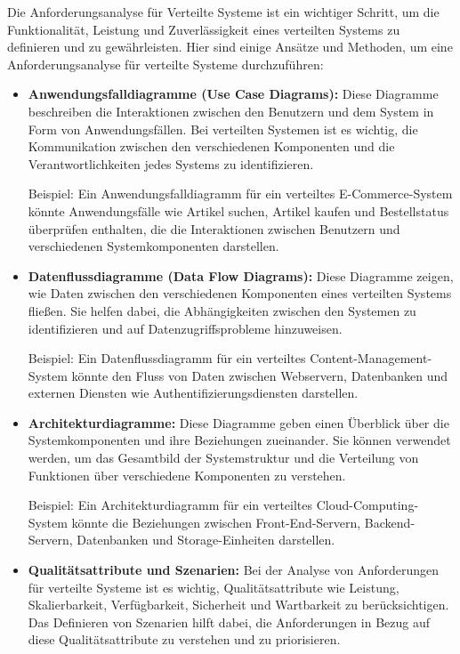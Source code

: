 \documentclass[../vs-script-first-v01.tex]{subfiles}
\begin{document}
Die Anforderungsanalyse für Verteilte Systeme ist ein wichtiger Schritt, um die Funktionalität, Leistung und Zuverlässigkeit eines verteilten Systems zu definieren und zu gewährleisten. Hier sind einige Ansätze und Methoden, um eine Anforderungsanalyse für verteilte Systeme durchzuführen:
\begin{itemize}
  \item \textbf{Anwendungsfalldiagramme (Use Case Diagrams):} Diese Diagramme beschreiben die Interaktionen zwischen den Benutzern und dem System in Form von Anwendungsfällen. Bei verteilten Systemen ist es wichtig, die Kommunikation zwischen den verschiedenen Komponenten und die Verantwortlichkeiten jedes Systems zu identifizieren.

        Beispiel: Ein Anwendungsfalldiagramm für ein verteiltes E-Commerce-System könnte Anwendungsfälle wie Artikel suchen, Artikel kaufen und Bestellstatus überprüfen enthalten, die die Interaktionen zwischen Benutzern und verschiedenen Systemkomponenten darstellen.

  \item \textbf{Datenflussdiagramme (Data Flow Diagrams):} Diese Diagramme zeigen, wie Daten zwischen den verschiedenen Komponenten eines verteilten Systems fließen. Sie helfen dabei, die Abhängigkeiten zwischen den Systemen zu identifizieren und auf Datenzugriffsprobleme hinzuweisen.

        Beispiel: Ein Datenflussdiagramm für ein verteiltes Content-Management-System könnte den Fluss von Daten zwischen Webservern, Datenbanken und externen Diensten wie Authentifizierungsdiensten darstellen.

  \item \textbf{Architekturdiagramme:} Diese Diagramme geben einen Überblick über die Systemkomponenten und ihre Beziehungen zueinander. Sie können verwendet werden, um das Gesamtbild der Systemstruktur und die Verteilung von Funktionen über verschiedene Komponenten zu verstehen.

        Beispiel: Ein Architekturdiagramm für ein verteiltes Cloud-Computing-System könnte die Beziehungen zwischen Front-End-Servern, Backend-Servern, Datenbanken und Storage-Einheiten darstellen.

  \item \textbf{Qualitätsattribute und Szenarien:} Bei der Analyse von Anforderungen für verteilte Systeme ist es wichtig, Qualitätsattribute wie Leistung, Skalierbarkeit, Verfügbarkeit, Sicherheit und Wartbarkeit zu berücksichtigen. Das Definieren von Szenarien hilft dabei, die Anforderungen in Bezug auf diese Qualitätsattribute zu verstehen und zu priorisieren.


\end{itemize}
\end{document}
